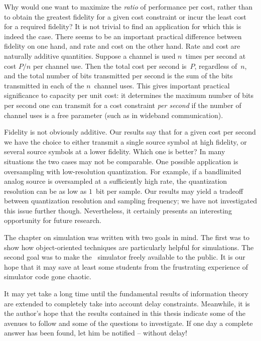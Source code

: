 Why would one want to maximize the \emph{ratio} of performance per cost, rather
than to obtain the greatest fidelity for a given cost constraint or incur the
least cost for a required fidelity? It is not trivial to find an application for
which this is indeed the case. There seems to be an important practical
difference between fidelity on one hand, and rate and cost on the other hand.
Rate and cost are naturally additive quantities. Suppose a channel is used
$n$~times per second at cost $P/n$ per channel use. Then the total cost per
second is~$P$, regardless of~$n$, and the total number of bits transmitted per
second is the sum of the bits transmitted in each of the $n$~channel uses. This
gives important practical significance to capacity per unit cost: it determines
the maximum number of bits per second one can transmit for a cost constraint
\emph{per second} if the number of channel uses is a free parameter (such as in
wideband communication). 

Fidelity is not obviously additive. Our results say that for a given cost per
second we have the choice to either transmit a single source symbol at high
fidelity, or several source symbols at a lower fidelity.  Which one is
better? In many situations the two cases may not be comparable. One possible
application is oversampling with low-resolution quantization.  For example, if a
bandlimited analog source is oversampled at a sufficiently high rate, the
quantization resolution can be as low as $1$~bit per sample. Our
results may yield a tradeoff between quantization resolution and sampling
frequency; we have not investigated this issue further though.  Nevertheless, it
certainly presents an interesting opportunity for future research. 

\medbreak

The chapter on simulation was written with two goals in mind. The first was to
show how object-oriented techniques are particularly helpful for simulations.
The second goal was to make the \jscsim\ simulator freely available to the
public. It is our hope that it may save at least some students from the
frustrating experience of simulator code gone chaotic. 

\medbreak

It may yet take a long time until the fundamental results of information theory
are extended to completely take into account delay constraints. Meanwhile, it is
the author's hope that the results contained in this thesis indicate some of the
avenues to follow and some of the questions to investigate. If one day a
complete answer has been found, let him be notified -- without delay!
